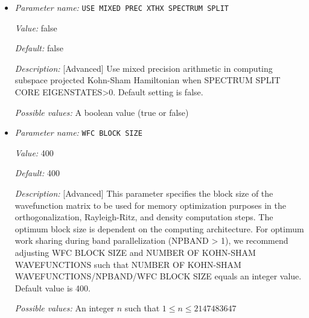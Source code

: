\begin{itemize}
{\it Value:} false


{\it Default:} false


{\it Description:} [Advanced] Use mixed precision arithmetic in Rayleigh-Ritz subspace rotation step. Default setting is false.


{\it Possible values:} A boolean value (true or false)
\item {\it Parameter name:} {\tt USE MIXED PREC XTHX SPECTRUM SPLIT}
\label{parameters:SCF parameters/Eigen_2dsolver parameters/USE MIXED PREC XTHX SPECTRUM SPLIT}
\label{parameters:SCF_20parameters/Eigen_2dsolver_20parameters/USE_20MIXED_20PREC_20XTHX_20SPECTRUM_20SPLIT}


{\it Value:} false


{\it Default:} false


{\it Description:} [Advanced] Use mixed precision arithmetic in computing subspace projected Kohn-Sham Hamiltonian when SPECTRUM SPLIT CORE EIGENSTATES>0.  Default setting is false.


{\it Possible values:} A boolean value (true or false)
\item {\it Parameter name:} {\tt WFC BLOCK SIZE}
\label{parameters:SCF parameters/Eigen_2dsolver parameters/WFC BLOCK SIZE}
\label{parameters:SCF_20parameters/Eigen_2dsolver_20parameters/WFC_20BLOCK_20SIZE}


{\it Value:} 400


{\it Default:} 400


{\it Description:} [Advanced]  This parameter specifies the block size of the wavefunction matrix to be used for memory optimization purposes in the orthogonalization, Rayleigh-Ritz, and density computation steps. The optimum block size is dependent on the computing architecture. For optimum work sharing during band parallelization (NPBAND > 1), we recommend adjusting WFC BLOCK SIZE and NUMBER OF KOHN-SHAM WAVEFUNCTIONS such that NUMBER OF KOHN-SHAM WAVEFUNCTIONS/NPBAND/WFC BLOCK SIZE equals an integer value. Default value is 400.


{\it Possible values:} An integer $n$ such that $1\leq n \leq 2147483647$
\end{itemize}

